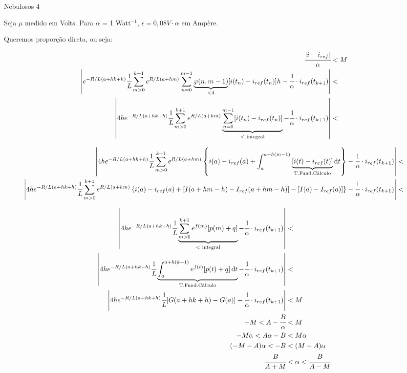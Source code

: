 \documentclass[10pt]{article}
\begin{document}
\Large

\begin{center}
Nebulosos 4
\end{center}

\normalsize

Seja $\mu$ medido em Volts. Para $\alpha$ = 1 Watt$^{-1}$, $\epsilon = 0,08V \cdot \alpha$ em Amp\`ere.

Queremos propor\c{c}\~ao direta, ou seja:

\begin{align}
  \cfrac{|i - i_{ref}|}{\alpha} &< M \\
  \left\vert e^{-R/L (a + hk + h)}\cfrac{1}{L}\sum_{m > 0}^{k + 1} e^{R/L (a + hm)}  \sum_{n = 0}^{m - 1} \underbrace{\varphi(n,m-1)}_{<4} [i(t_n) - i_{ref}(t_n)] h - \cfrac{1}{\alpha} \cdot i_{ref}(t_{k+1}) \right\vert &<  \\
  \left\vert 4h e^{-R/L (a + hk + h)}\cfrac{1}{L}\sum_{m > 0}^{k + 1} e^{R/L (a + hm)}  \underbrace{\sum_{n = 0}^{m - 1} [i(t_n) - i_{ref}(t_n)]}_{<\text{ integral}} - \cfrac{1}{\alpha} \cdot i_{ref}(t_{k+1}) \right\vert &<
\end{align}

\footnotesize

\begin{align}
  \left\vert 4h e^{-R/L (a + hk + h)}\cfrac{1}{L}\sum_{m > 0}^{k + 1} e^{R/L (a + hm)}  \left\{ i(a) - i_{ref}(a) + \int_a^{a + h(m - 1)} \underbrace{[i(t) - i_{ref}(t)]}_{\text{T.Fund.C\'alculo}} \mathrm{d}t \right\} - \cfrac{1}{\alpha} \cdot i_{ref}(t_{k+1}) \right\vert &<  \\
  \left\vert 4h e^{-R/L (a + hk + h)}\cfrac{1}{L}\sum_{m > 0}^{k + 1} e^{R/L (a + hm)}  \left\{ i(a) - i_{ref}(a) + [I(a + hm - h) - I_{ref}(a + hm - h)] - [I(a) - I_{ref}(a)] \right\} - \cfrac{1}{\alpha} \cdot i_{ref}(t_{k+1}) \right\vert &<
\end{align}

\normalsize

\begin{align}
  \left\vert 4h e^{-R/L (a + hk + h)}\cfrac{1}{L} \underbrace{\sum_{m > 0}^{k + 1} e^{f(m)} [p(m) + q]}_{<\text{ integral}}  - \cfrac{1}{\alpha} \cdot i_{ref}(t_{k+1}) \right\vert &<  \\
  \left\vert 4h e^{-R/L (a + hk + h)}\cfrac{1}{L} \underbrace{\int_a^{a + h(k + 1)} e^{f(t)} [p(t) + q] \,\mathrm{d}t}_{\text{T.Fund.C\'alculo}}  - \cfrac{1}{\alpha} \cdot i_{ref}(t_{k+1}) \right\vert &<  \\
  \left\vert 4h e^{-R/L (a + hk + h)}\cfrac{1}{L} [G(a + hk + h) - G(a)]  - \cfrac{1}{\alpha} \cdot i_{ref}(t_{k+1}) \right\vert &< M \\
  - M < A - \cfrac{B}{\alpha} &< M \\
  - M\alpha < A\alpha - B &< M \alpha \\
  (- M - A)\alpha < - B &< (M - A) \alpha \\
  \cfrac{B}{A + M} &< \alpha < \cfrac{B}{A - M}
\end{align}
\end{document}
